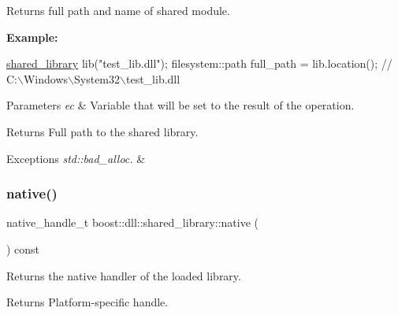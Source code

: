 Returns full path and name of shared module.

{\bfseries Example\+:} 
\begin{DoxyCode}
\hyperlink{a01708_a2ebb56c35c652538adac15f9e7042bc3}{shared\_library} lib(\textcolor{stringliteral}{"test\_lib.dll"});
filesystem::path full\_path = lib.location(); \textcolor{comment}{// C:\(\backslash\)Windows\(\backslash\)System32\(\backslash\)test\_lib.dll}
\end{DoxyCode}



\begin{DoxyParams}{Parameters}
{\em ec} & Variable that will be set to the result of the operation. \\
\hline
\end{DoxyParams}
\begin{DoxyReturn}{Returns}
Full path to the shared library. 
\end{DoxyReturn}

\begin{DoxyExceptions}{Exceptions}
{\em std\+::bad\+\_\+alloc.} & \\
\hline
\end{DoxyExceptions}
\mbox{\label{a01708_acdc34332bdbfed7ea81081cb8dc3af1f}} 
\subsubsection{\texorpdfstring{native()}{native()}}
{\footnotesize\ttfamily native\+\_\+handle\+\_\+t boost\+::dll\+::shared\+\_\+library\+::native (\begin{DoxyParamCaption}{ }\end{DoxyParamCaption}) const\hspace{0.3cm}{\ttfamily [inline]}}

Returns the native handler of the loaded library.

\begin{DoxyReturn}{Returns}
Platform-\/specific handle. 
\end{DoxyReturn}
\mbox{\label{a01708_ab790a042574a0df32b4fb424402e2d50}} 
